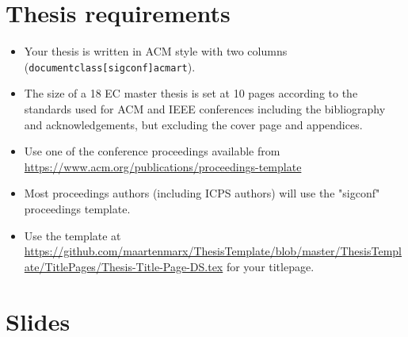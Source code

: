 \documentclass[sigconf,format=acmsmall, screen=true, review=false]{acmart}
\begin{document}
%

\pagebreak


\pagebreak

\begin{abstract}
\end{abstract}


\section*{Thesis requirements}
\begin{itemize}
\item Your thesis is written in ACM style with two columns  (\texttt{documentclass[sigconf]{acmart}}).
\item   The	size	 of	a	18	EC master	thesis	is	set	at	10	pages	according	to	the	standards	used	for	ACM	and	IEEE	 conferences	 including	 the	 bibliography and	 acknowledgements,	 but excluding	 the	 cover	 page and	appendices.
\item Use one of the conference proceedings available from \url{https://www.acm.org/publications/proceedings-template}
\item Most proceedings authors (including ICPS authors) will use the "sigconf" proceedings template.
\item Use the template at \url{https://github.com/maartenmarx/ThesisTemplate/blob/master/ThesisTemplate/TitlePages/Thesis-Title-Page-DS.tex} for your titlepage.
\end{itemize}


\pagebreak













\appendix

%


\section{Slides}


 
\end{document}
